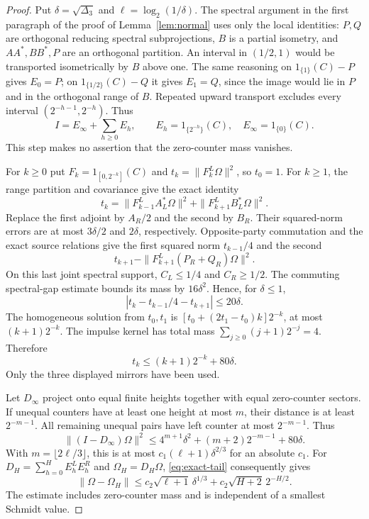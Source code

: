 \begin{proof}
Put $\delta=\sqrt{\Delta_3}$ and $\ell=\log_2(1/\delta)$. The spectral argument in the first paragraph of the proof of Lemma~\ref{lem:normal} uses only the local identities: $P,Q$ are orthogonal reducing spectral subprojections, $B$ is a partial isometry, and $AA^*,BB^*,P$ are an orthogonal partition. An interval in $(1/2,1)$ would be transported isometrically by $B$ above one. The same reasoning on $1_{\{1\}}(C)-P$ gives $E_0=P$; on $1_{\{1/2\}}(C)-Q$ it gives $E_1=Q$, since the image would lie in $P$ and in the orthogonal range of $B$. Repeated upward transport excludes every interval $(2^{-h-1},2^{-h})$. Thus
\[
 I=E_\infty+\sum_{h\ge0}E_h,\qquad
 E_h=1_{\{2^{-h}\}}(C),\quad E_\infty=1_{\{0\}}(C).
\]
This step makes no assertion that the zero-counter mass vanishes.

For $k\ge0$ put $F_k=1_{[0,2^{-k}]}(C)$ and $t_k=\|F_k^L\Omega\|^2$, so $t_0=1$. For $k\ge1$, the range partition and covariance give the exact identity
\[
 t_k=\|F_{k-1}^LA_L^*\Omega\|^2
           +\|F_{k+1}^LB_L^*\Omega\|^2.
\]
Replace the first adjoint by $A_R/2$ and the second by $B_R$. Their squared-norm errors are at most $3\delta/2$ and $2\delta$, respectively. Opposite-party commutation and the exact source relations give the first squared norm $t_{k-1}/4$ and the second
\[
 t_{k+1}-\|F_{k+1}^L(P_R+Q_R)\Omega\|^2.
\]
On this last joint spectral support, $C_L\le1/4$ and $C_R\ge1/2$. The commuting spectral-gap estimate bounds its mass by $16\delta^2$. Hence, for $\delta\le1$,
\[
 |t_k-t_{k-1}/4-t_{k+1}|\le20\delta.
\]
The homogeneous solution from $t_0,t_1$ is $[t_0+(2t_1-t_0)k]2^{-k}$, at most $(k+1)2^{-k}$. The impulse kernel has total mass $\sum_{j\ge0}(j+1)2^{-j}=4$. Therefore
\begin{equation}\label{eq:exact-tail}
 t_k\le(k+1)2^{-k}+80\delta.
\end{equation}
Only the three displayed mirrors have been used.

Let $D_\infty$ project onto equal finite heights together with equal zero-counter sectors. If unequal counters have at least one height at most $m$, their distance is at least $2^{-m-1}$. All remaining unequal pairs have left counter at most $2^{-m-1}$. Thus
\[
 \|(I-D_\infty)\Omega\|^2
 \le4^{m+1}\delta^2+(m+2)2^{-m-1}+80\delta.
\]
With $m=\lfloor2\ell/3\rfloor$, this is at most $c_1(\ell+1)\delta^{2/3}$ for an absolute $c_1$. For $D_H=\sum_{h=0}^HE_h^LE_h^R$ and $\Omega_H=D_H\Omega$, \eqref{eq:exact-tail} consequently gives
\begin{equation}\label{eq:exact-match}
 \|\Omega-\Omega_H\|\le
 c_2\sqrt{\ell+1}\,\delta^{1/3}
 +c_2\sqrt{H+2}\,2^{-H/2}.
\end{equation}
The estimate includes zero-counter mass and is independent of a smallest Schmidt value.


\end{proof}
